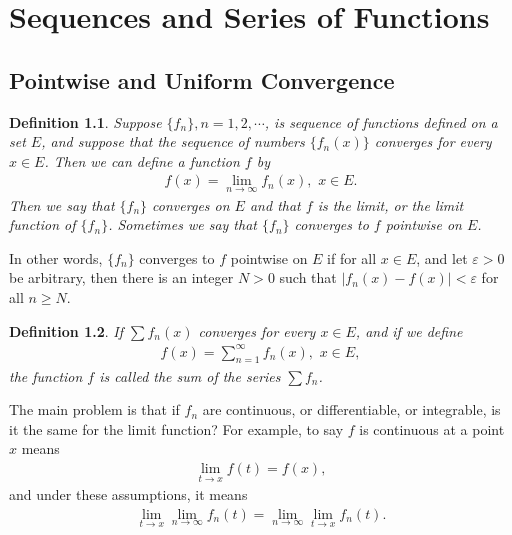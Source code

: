 \documentclass[11pt]{book}
\newtheorem{definition}{Definition}[chapter]
\theoremstyle{definition}
\numberwithin{equation}{chapter}
\begin{document}
\medskip





\chapter{Sequences and Series of Functions}

\section{Pointwise and Uniform Convergence}

\begin{definition}
Suppose $\{f_n\}, n = 1,2,\cdots$, is sequence of functions defined on a set $E$, and suppose that the sequence of numbers $\{f_n(x)\}$ converges for every $x \in E$. Then we can define a function $f$ by
\begin{align*}
    f(x) = \lim_{n\to\infty} f_n(x), \,\, x \in E.
\end{align*}
Then we say that $\{f_n\}$ converges on $E$ and that $f$ is the limit, or the limit function of $\{f_n\}$. Sometimes we say that $\{f_n\}$ converges to $f$ pointwise on $E$.
\end{definition}

\medskip

In other words, $\{f_n\}$ converges to $f$ pointwise on $E$ if for all $x \in E$, and let $\varepsilon > 0$ be arbitrary, then there is an integer $N > 0$ such that $\left|f_n(x) - f(x)\right| < \varepsilon$ for all $n \geq N$.

\medskip

\begin{definition}
If $\sum f_n(x)$ converges for every $x \in E$, and if we define
\begin{align*}
    f(x) = \sum^\infty_{n=1} f_n(x),  \,\, x \in E,
\end{align*}
the function $f$ is called the sum of the series $\sum f_n$.
\end{definition}

\medskip

The main problem is that if $f_n$ are continuous, or differentiable, or integrable, is it the same for the limit function? For example, to say $f$ is continuous at a point $x$ means
\begin{align*}
    \lim_{t\to x} f(t) = f(x),
\end{align*}
and under these assumptions, it means
\begin{align*}
    \lim_{t\to x} \lim_{n\to\infty} f_n(t) = \lim_{n\to\infty} \lim_{t\to x} f_n(t).
\end{align*}
\end{document}
